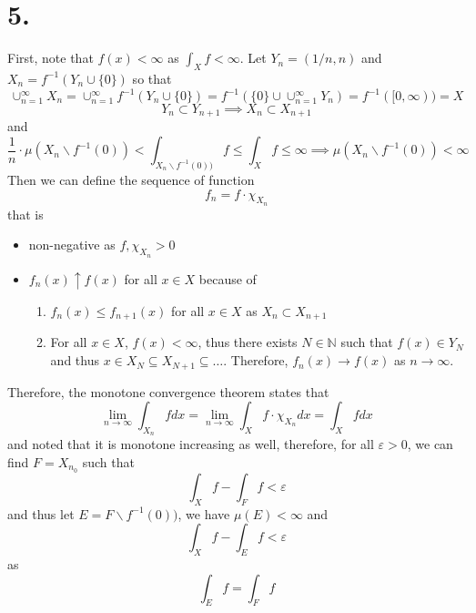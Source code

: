 \documentclass[11pt]{article}
\theoremstyle{mystyle}
\theoremstyle{definition}
\begin{document}
\section*{5.}
First, note that $f(x) < \infty$ as $\int_X f < \infty$. Let $Y_n = (1/n, n)$ and $X_n = f^{-1}(Y_n \cup \{0\})$ so that 
\[
  \cup_{n=1}^\infty X_n = \cup_{n=1}^\infty f^{-1}(Y_n \cup \{0\}) = f^{-1}(\{0\} \cup \cup_{n=1}^\infty Y_n ) = f^{-1}([0,\infty)) = X 
\]  
\[
  Y_n \subset Y_{n+1} \implies X_n \subset X_{n+1}
\]
and 
\[
  \displaystyle\frac{1}{n} \cdot \mu(X_n \backslash f^{-1}(0)) < \int_{X_n \backslash f^{-1}(0))} f \le \int_X f  \le \infty \implies \mu(X_n \backslash f^{-1}(0)) < \infty 
\]
Then we can define the sequence of function 
\[
  f_n = f \cdot \chi_{X_n}
\]
that is
\begin{itemize}
  \item non-negative as $f, \chi_{X_n} > 0$ 
  \item $f_n(x) \uparrow f(x)$ for all $x \in X$ because of 
    \begin{enumerate}
      \item $f_n(x) \le f_{n+1}(x)$ for all $x \in X$ as $X_n \subset X_{n+1}$ 
      \item For all $x \in X$, $f(x) < \infty$, thus there exists $N \in \mathbb{N}$ such that $f(x) \in Y_N$ and thus $x \in X_N \subseteq X_{N+1} \subseteq \hdots $. Therefore, $f_n(x) \to f(x)$ as $n \to \infty$. 
    \end{enumerate}
\end{itemize}
Therefore, the monotone convergence theorem states that 
\[
  \lim_{n \to \infty} \int_{X_n} f dx = \lim_{n \to \infty} \int_X f \cdot \chi_{X_n} dx = \int_X f dx
\]
and noted that it is monotone increasing as well, therefore, for all $\varepsilon > 0$, we can find $F = X_{n_0}$ such that  
\[
  \int_X f - \int_F f < \varepsilon
\]
and thus let $E = F \backslash f^{-1}(0))$, we have $\mu(E) < \infty$ and 
\[
  \int_X f - \int_E f < \varepsilon
\]
as 
\[
  \int_E f = \int_F f
\]
\end{document}
